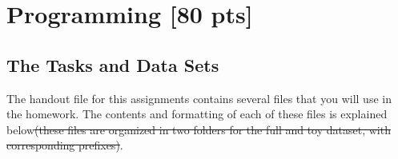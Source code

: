 \documentclass[11pt,addpoints,answers]{exam}
\numberwithin{equation}{section} %
\numberwithin{figure}{section} %
\numberwithin{table}{section} %
\providecommand{\DIFdeltex}[1]{{\protect\color{red}\sout{#1}}}                      %
\providecommand{\DIFdelbegin}{} %
\providecommand{\DIFdelend}{} %
\providecommand{\DIFdel}[1]{\texorpdfstring{\DIFdeltex{#1}}{}} %
\newcommand{\DIFscaledelfig}{0.5}
\newlength{\DIFdelgraphicswidth} %
\newlength{\DIFdelgraphicsheight} %
\newcommand{\DIFdelincludegraphics}[2][]{%
\sbox{\DIFdelgraphicsbox}{\DIFOincludegraphics[#1]{#2}}%
\settoboxwidth{\DIFdelgraphicswidth}{\DIFdelgraphicsbox} %
\settoboxtotalheight{\DIFdelgraphicsheight}{\DIFdelgraphicsbox} %
\scalebox{\DIFscaledelfig}{%
\parbox[b]{\DIFdelgraphicswidth}{\usebox{\DIFdelgraphicsbox}\\[-\baselineskip] \rule{\DIFdelgraphicswidth}{0em}}\llap{\resizebox{\DIFdelgraphicswidth}{\DIFdelgraphicsheight}{%
\setlength{\unitlength}{\DIFdelgraphicswidth}%
\begin{picture}(1,1)%
\thicklines\linethickness{2pt} %
{\color[rgb]{1,0,0}\put(0,0){\framebox(1,1){}}}%
{\color[rgb]{1,0,0}\put(0,0){\line( 1,1){1}}}%
{\color[rgb]{1,0,0}\put(0,1){\line(1,-1){1}}}%
\end{picture}%
}\hspace*{3pt}}} %
} %
\DeclareRobustCommand{\DIFdelbegin}{\DIFOdelbegin \let\includegraphics\DIFdelincludegraphics} %
\DeclareRobustCommand{\DIFdelend}{\DIFOaddend \let\includegraphics\DIFOincludegraphics} %
\begin{document}
\begin{tcolorbox}[fit,height=10cm, width=17cm, blank, borderline={1pt}{-2pt}]
    \end{tcolorbox}

\clearpage\section{Programming [80 pts]}
\label{programming}

\subsection{The Tasks and Data Sets}\label{dataset}
The handout file for this assignments contains several files that you will use in the homework. The contents and formatting of each of these files is explained below\DIFdelbegin \DIFdel{(these files are organized in two folders for the full and toy dataset, with corresponding prefixes)}\DIFdelend .
\end{document}
